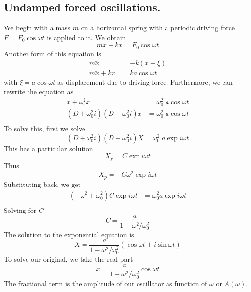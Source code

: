 \documentclass[../../../main.tex]{subfiles}
\begin{document}
\subsection*{Undamped forced oscillations.} We begin with a mass $m$ on a horizontal spring with a periodic driving force $F = F_0 \cos \omega t$ is applied to it. We obtain
\begin{equation*}
    m\ddot{x}+kx=F_0 \cos \omega t
\end{equation*}
Another form of this equation is 
\begin{align*}
    m\ddot{x}&=-k(x-\xi)\\
    m\ddot{x}+kx&=ka \cos \omega t
\end{align*}
with $\xi=a \cos \omega t$ as displacement due to driving force. Furthermore, we can rewrite the equation as
\begin{align*}
    \ddot{x}+\omega_0^2x&=\omega_0^2\;a \cos \omega t\\
    (D+\omega_0^2i)(D-\omega_0^2i)x&=\omega_0^2\;a\cos \omega t\\
\end{align*}
To solve this, first we solve 
\begin{equation*}
    (D+\omega_0^2i)(D-\omega_0^2i)X=\omega_0^2\;a\exp i\omega t
\end{equation*}
This has a particular solution
\begin{equation*}
    X_p=C\exp{i\omega t}
\end{equation*}
Thus
\begin{equation*}
    \ddot{X}_p=-C\omega^2\exp{i\omega t}
\end{equation*}
Substituting back, we get
\begin{align*}
    (-\omega^2+\omega_0^2)C\exp{i\omega t}&=\omega_0^2a\exp{i\omega t}\\
\end{align*}
Solving for $C$
\begin{equation*}
    C=\frac{a}{1-\omega^2/\omega_0^2}
\end{equation*}
The solution to the exponential equation is 
\begin{equation*}
    X=\frac{a}{1-\omega^2/\omega_0^2}(\cos\omega t+i\sin \omega t)
\end{equation*}
To solve our original, we take the real part 
\begin{equation*}
    x=\frac{a}{1-\omega^2/\omega_0^2}\cos\omega t
\end{equation*}
The fractional term is the amplitude of our oscillator as function of $\omega$ or $A(\omega)$.
\end{document}
